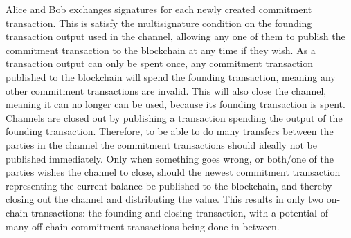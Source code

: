 Alice and Bob exchanges signatures for each newly created commitment transaction. This is satisfy the multisignature condition on the founding transaction output used in the channel, allowing any one of them to publish the commitment transaction to the blockchain at any time if they wish. As a transaction output can only be spent once, any commitment transaction published to the blockchain will spend the founding transaction, meaning any other commitment transactions are invalid. This will also close the channel, meaning it can no longer can be used, because its founding transaction is spent. Channels are closed out by publishing a transaction spending the output of the founding transaction. Therefore, to be able to do many transfers between the parties in the channel the commitment transactions should ideally not be published immediately. Only when something goes wrong, or both/one of the parties wishes the channel to close, should the newest commitment transaction representing the current balance be published to the blockchain, and thereby closing out the channel and distributing the value. This results in only two on-chain transactions: the founding and closing transaction, with a potential of many off-chain commitment transactions being done in-between.
\\

